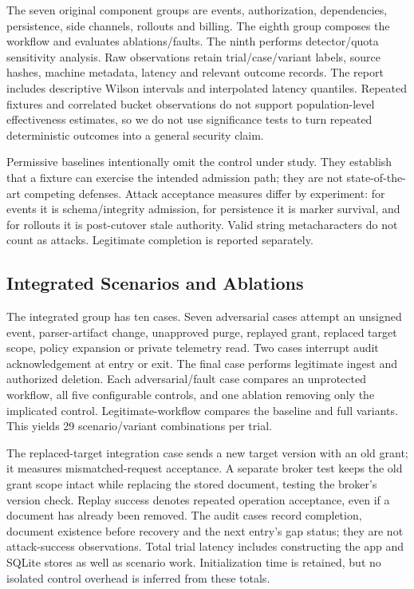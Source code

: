\documentclass[11pt,a4paper]{article}
\begin{document}
The seven original component groups are events, authorization, dependencies, persistence, side channels, rollouts and billing. The eighth group composes the workflow and evaluates ablations/faults. The ninth performs detector/quota sensitivity analysis. Raw observations retain trial/case/variant labels, source hashes, machine metadata, latency and relevant outcome records. The report includes descriptive Wilson intervals and interpolated latency quantiles. Repeated fixtures and correlated bucket observations do not support population-level effectiveness estimates, so we do not use significance tests to turn repeated deterministic outcomes into a general security claim.

Permissive baselines intentionally omit the control under study. They establish that a fixture can exercise the intended admission path; they are not state-of-the-art competing defenses. Attack acceptance measures differ by experiment: for events it is schema/integrity admission, for persistence it is marker survival, and for rollouts it is post-cutover stale authority. Valid string metacharacters do not count as attacks. Legitimate completion is reported separately.

\subsection{Integrated Scenarios and Ablations}
The integrated group has ten cases. Seven adversarial cases attempt an unsigned event, parser-artifact change, unapproved purge, replayed grant, replaced target scope, policy expansion or private telemetry read. Two cases interrupt audit acknowledgement at entry or exit. The final case performs legitimate ingest and authorized deletion. Each adversarial/fault case compares an unprotected workflow, all five configurable controls, and one ablation removing only the implicated control. Legitimate-workflow compares the baseline and full variants. This yields 29 scenario/variant combinations per trial.

The replaced-target integration case sends a new target version with an old grant; it measures mismatched-request acceptance. A separate broker test keeps the old grant scope intact while replacing the stored document, testing the broker's version check. Replay success denotes repeated operation acceptance, even if a document has already been removed. The audit cases record completion, document existence before recovery and the next entry's gap status; they are not attack-success observations. Total trial latency includes constructing the app and SQLite stores as well as scenario work. Initialization time is retained, but no isolated control overhead is inferred from these totals.
\end{document}
